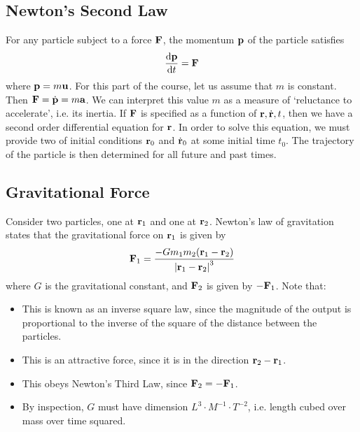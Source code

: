 \subsection{Newton's Second Law}
For any particle subject to a force $\vb F$, the momentum $\vb p$ of the particle satisfies
\[ \frac{\dd \vb p}{\dd{t}} = \vb F \]
where $\vb p = m \vb u$. For this part of the course, let us assume that $m$ is constant. Then $\vb F = \dot{\vb p} = m \vb a$. We can interpret this value $m$ as a measure of `reluctance to accelerate', i.e. its inertia. If $\vb F$ is specified as a function of $\vb r, \dot{\vb r}, t$, then we have a second order differential equation for $\vb r$. In order to solve this equation, we must provide two of initial conditions $\vb r_0$ and $\dot{\vb r}_0$ at some initial time $t_0$. The trajectory of the particle is then determined for all future and past times.

\subsection{Gravitational Force}
Consider two particles, one at $\vb r_1$ and one at $\vb r_2$. Newton's law of gravitation states that the gravitational force on $\vb r_1$ is given by
\[ \vb F_1 = \frac{- G m_1 m_2 (\vb r_1 - \vb r_2)}{\abs{\vb r_1 - \vb r_2}^3} \]
where $G$ is the gravitational constant, and $\vb F_2$ is given by $-\vb F_1$. Note that:
\begin{itemize}
	\item This is known as an inverse square law, since the magnitude of the output is proportional to the inverse of the square of the distance between the particles.
	\item This is an attractive force, since it is in the direction $\vb r_2 - \vb r_1$.
	\item This obeys Newton's Third Law, since $\vb F_2 = - \vb F_1$.
	\item By inspection, $G$ must have dimension $L^3 \cdot M^{-1} \cdot T^{-2}$, i.e. length cubed over mass over time squared.
\end{itemize}

